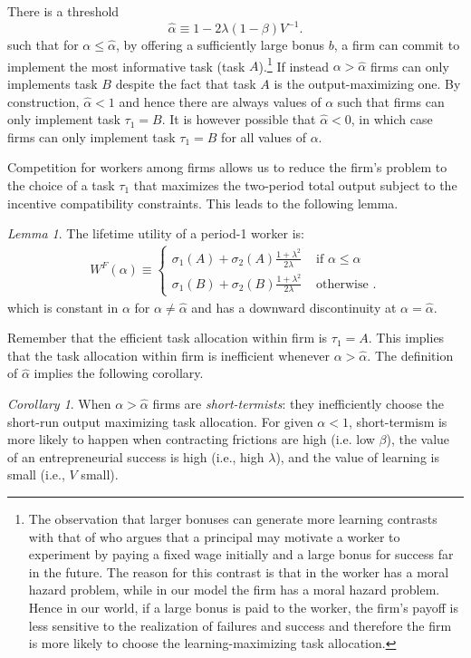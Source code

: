 \documentclass[12pt,american]{paper}
\theoremstyle{remark}
\newtheorem{lemma}{Lemma}
\newtheorem{cor}{Corollary}
\begin{document}
There is a threshold
\[
 \hat \alpha \equiv 1- 2 \lambda (1-\beta) V^{-1}.
\]
such that for $\alpha \leq \hat \alpha$, by offering a sufficiently large bonus $b$,  a firm can commit to  implement the most informative task (task $A$).\footnote{ The observation that larger bonuses can generate more learning contrasts with that of \citet{manso2011motivating} who argues that a principal may motivate a worker to experiment by paying a fixed wage initially and a large bonus for success far in the future. The reason for this contrast is that in \cite{manso2011motivating} the worker has a moral hazard problem, while in our model the firm has a moral hazard problem. Hence in our world, if a large bonus is paid to the worker, the firm's payoff is less sensitive to the realization of failures and success and therefore the firm is more likely to choose the learning-maximizing task allocation.} If instead  $\alpha > \hat \alpha$  firms can only implements task $B$ despite the fact that task $A$ is the output-maximizing one. By construction, $\hat \alpha <1$ and hence there are always values of $\alpha$ such that firms can only implement task $\tau_1=B$. It is however possible that $\hat \alpha <0$, in which case firms can only implement task $\tau_1=B$ for all values of $\alpha$.

Competition for workers among firms allows us to reduce the firm's problem to the choice of a task $\tau_1$ that maximizes the two-period total output subject to the incentive compatibility constraints. This leads to the following lemma.
\begin{lemma}
The lifetime utility of a period-1 worker is:
\begin{align}\label{eq: value worker}
W^F(\alpha) \equiv
\begin{cases}
\sigma_1(A)+\sigma_2(A)\frac{1+\lambda^2}{2\lambda} &\text{ if } \alpha \leq \hat \alpha\\
\sigma_1(B)+\sigma_2(B)\frac{1+\lambda^2}{2\lambda} &\text{ otherwise }.
\end{cases}
\end{align}
which is constant in $\alpha$ for $\alpha \neq \hat \alpha$ and has a downward discontinuity at $\alpha=\hat \alpha$.
\end{lemma}

Remember that the efficient task allocation within firm is $\tau_1=A$. This implies that the task allocation within firm is inefficient whenever  $\alpha>\hat \alpha$. The definition of $\hat \alpha$ implies the following corollary.
\begin{cor}
When $\alpha > \hat \alpha$ firms are \textit{short-termists}: they inefficiently choose the short-run output maximizing task allocation. For given $\alpha<1$, short-termism is more likely  to happen when  contracting frictions are high (i.e. low $\beta$),  the value of an entrepreneurial success is high (i.e., high $\lambda$), and the value of learning   is small (i.e., $V$ small). 
\end{cor}
\end{document}
